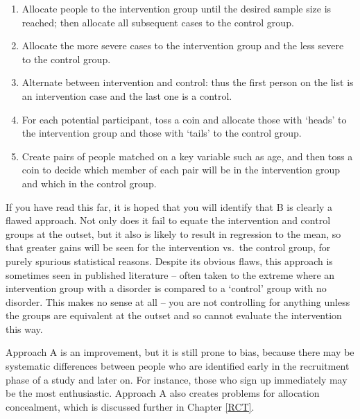 \documentclass{krantz}
\providecommand{\tightlist}{%
\setlength{\itemsep}{0pt}\setlength{\parskip}{0pt}}
\begin{document}
\begin{enumerate}
\def\labelenumi{\Alph{enumi}.}
\tightlist
\item
  Allocate people to the intervention group until the desired sample size is reached; then allocate all subsequent cases to the control group.\\
\item
  Allocate the more severe cases to the intervention group and the less severe to the control group.\\
\item
  Alternate between intervention and control: thus the first person on the list is an intervention case and the last one is a control.\\
\item
  For each potential participant, toss a coin and allocate those with `heads' to the intervention group and those with `tails' to the control group.\\
\item
  Create pairs of people matched on a key variable such as age, and then toss a coin to decide which member of each pair will be in the intervention group and which in the control group.
\end{enumerate}

If you have read this far, it is hoped that you will identify that B is clearly a flawed approach. Not only does it fail to equate the intervention and control groups at the outset, but it also is likely to result in regression to the mean, so that greater gains will be seen for the intervention vs.~the control group, for purely spurious statistical reasons. Despite its obvious flaws, this approach is sometimes seen in published literature -- often taken to the extreme where an intervention group with a disorder is compared to a `control' group with no disorder. This makes no sense at all -- you are not controlling for anything unless the groups are equivalent at the outset and so cannot evaluate the intervention this way.

Approach A is an improvement, but it is still prone to bias, because there may be systematic differences between people who are identified early in the recruitment phase of a study and later on. For instance, those who sign up immediately may be the most enthusiastic. Approach A also creates problems for allocation concealment, which is discussed further in Chapter \ref{RCT}.
\end{document}
